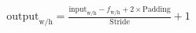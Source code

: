 \documentclass[preview]{standalone}
\begin{document}
\begin{align*}
\text{output}_{\text{w}/\text{h}} = \frac{\text{input}_{\text{w}/\text{h}} - f_{\text{w}/\text{h}} + 2\times \text{Padding}}{\text{Stride}} + 1
\end{align*}
\end{document}
